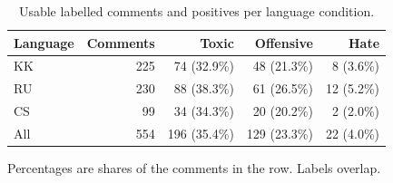 \begin{table}[htbp]
\centering
\caption{Usable labelled comments and positives per language condition.}
\label{tab:dataset}
\begin{tabular}{lrrrr}
\toprule
Language & Comments & Toxic & Offensive & Hate \\
\midrule
KK & 225 & 74 (32.9\%) & 48 (21.3\%) & 8 (3.6\%) \\
RU & 230 & 88 (38.3\%) & 61 (26.5\%) & 12 (5.2\%) \\
CS & 99 & 34 (34.3\%) & 20 (20.2\%) & 2 (2.0\%) \\
\midrule
All & 554 & 196 (35.4\%) & 129 (23.3\%) & 22 (4.0\%) \\
\bottomrule
\end{tabular}
\par\smallskip\footnotesize Percentages are shares of the comments in the row. Labels overlap.
\end{table}
